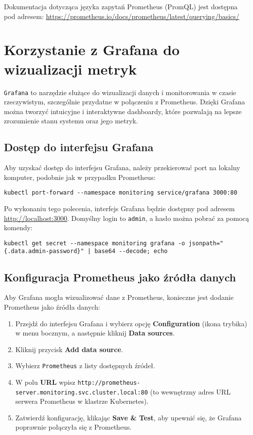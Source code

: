 \documentclass{article}
\begin{document}
Dokumentacja dotycząca języka zapytań Prometheus (PromQL) jest dostępna pod adresem: \url{https://prometheus.io/docs/prometheus/latest/querying/basics/}

\section{Korzystanie z Grafana do wizualizacji metryk}

\texttt{Grafana} to narzędzie służące do wizualizacji danych i monitorowania w czasie rzeczywistym, szczególnie przydatne w połączeniu z Prometheus. Dzięki Grafana można tworzyć intuicyjne i interaktywne dashboardy, które pozwalają na lepsze zrozumienie stanu systemu oraz jego metryk.

\subsection{Dostęp do interfejsu Grafana}

Aby uzyskać dostęp do interfejsu Grafana, należy przekierować port na lokalny komputer, podobnie jak w przypadku Prometheus:

\begin{lstlisting}
kubectl port-forward --namespace monitoring service/grafana 3000:80
\end{lstlisting}

Po wykonaniu tego polecenia, interfejs Grafana będzie dostępny pod adresem \url{http://localhost:3000}. Domyślny login to \texttt{admin}, a hasło można pobrać za pomocą komendy:

\begin{lstlisting}
kubectl get secret --namespace monitoring grafana -o jsonpath="{.data.admin-password}" | base64 --decode; echo
\end{lstlisting}

\subsection{Konfiguracja Prometheus jako źródła danych}

Aby Grafana mogła wizualizować dane z Prometheus, konieczne jest dodanie Prometheus jako źródła danych:

\begin{enumerate}
    \item Przejdź do interfejsu Grafana i wybierz opcję \textbf{Configuration} (ikona trybika) w menu bocznym, a następnie kliknij \textbf{Data sources}.
    \item Kliknij przycisk \textbf{Add data source}.
    \item Wybierz \texttt{Prometheus} z listy dostępnych źródeł.
    \item W polu \textbf{URL} wpisz \texttt{http://prometheus-server.monitoring.svc.cluster.local:80} (to wewnętrzny adres URL serwera Prometheus w klastrze Kubernetes).
    \item Zatwierdź konfigurację, klikając \textbf{Save \& Test}, aby upewnić się, że Grafana poprawnie połączyła się z Prometheus.
\end{enumerate}
\end{document}
